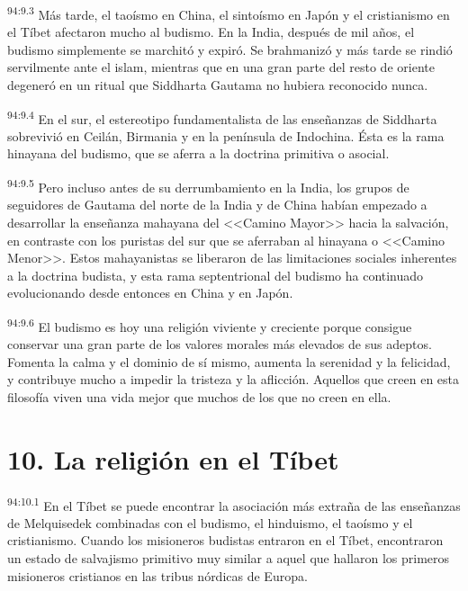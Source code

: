 \par
\textsuperscript{94:9.3} Más tarde, el taoísmo en China, el sintoísmo en Japón y el cristianismo en el Tíbet afectaron mucho al budismo. En la India, después de mil años, el budismo simplemente se marchitó y expiró. Se brahmanizó y más tarde se rindió servilmente ante el islam, mientras que en una gran parte del resto de oriente degeneró en un ritual que Siddharta Gautama no hubiera reconocido nunca.

\par
\textsuperscript{94:9.4} En el sur, el estereotipo fundamentalista de las enseñanzas de Siddharta sobrevivió en Ceilán, Birmania y en la península de Indochina. Ésta es la rama hinayana del budismo, que se aferra a la doctrina primitiva o asocial.

\par
\textsuperscript{94:9.5} Pero incluso antes de su derrumbamiento en la India, los grupos de seguidores de Gautama del norte de la India y de China habían empezado a desarrollar la enseñanza mahayana del <<Camino Mayor>> hacia la salvación, en contraste con los puristas del sur que se aferraban al hinayana o <<Camino Menor>>. Estos mahayanistas se liberaron de las limitaciones sociales inherentes a la doctrina budista, y esta rama septentrional del budismo ha continuado evolucionando desde entonces en China y en Japón.

\par
\textsuperscript{94:9.6} El budismo es hoy una religión viviente y creciente porque consigue conservar una gran parte de los valores morales más elevados de sus adeptos. Fomenta la calma y el dominio de sí mismo, aumenta la serenidad y la felicidad, y contribuye mucho a impedir la tristeza y la aflicción. Aquellos que creen en esta filosofía viven una vida mejor que muchos de los que no creen en ella.

\section*{10. La religión en el Tíbet}
\par
\textsuperscript{94:10.1} En el Tíbet se puede encontrar la asociación más extraña de las enseñanzas de Melquisedek combinadas con el budismo, el hinduismo, el taoísmo y el cristianismo. Cuando los misioneros budistas entraron en el Tíbet, encontraron un estado de salvajismo primitivo muy similar a aquel que hallaron los primeros misioneros cristianos en las tribus nórdicas de Europa.

